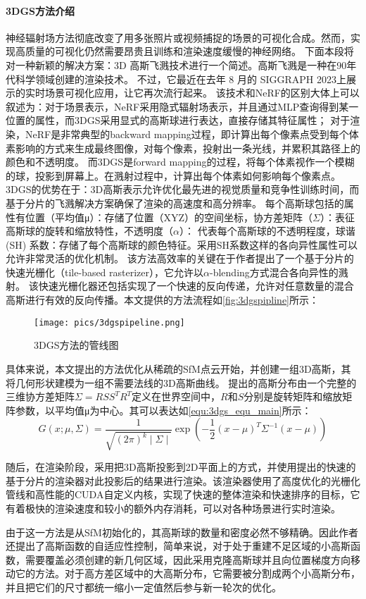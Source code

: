 \paragraph{3DGS方法介绍}
神经辐射场方法彻底改变了用多张照片或视频捕捉的场景的可视化合成。然而，实现高质量的可视化仍然需要昂贵且训练和渲染速度缓慢的神经网络。
下面本段将对一种新颖的解决方案：3D 高斯飞溅技术进行一个简述。高斯飞溅是一种在90年代科学领域创建的渲染技术。
不过，它最近在去年 8 月的 SIGGRAPH 2023上展示的实时场景可视化应用，让它再次流行起来。
该技术和NeRF的区别大体上可以叙述为：对于场景表示，NeRF采用隐式辐射场表示，并且通过MLP查询得到某一位置的属性，而3DGS采用显式的高斯球进行表达，直接存储其特征属性；
对于渲染，NeRF是非常典型的backward mapping过程，即计算出每个像素点受到每个体素影响的方式来生成最终图像，对每个像素，投射出一条光线，并累积其路径上的颜色和不透明度。
而3DGS是forward mapping的过程，将每个体素视作一个模糊的球，投影到屏幕上。在溅射过程中，计算出每个体素如何影响每个像素点。
3DGS的优势在于：3D高斯表示允许优化最先进的视觉质量和竞争性训练时间，而基于分片的飞溅解决方案确保了渲染的高速度和高分辨率。
每个高斯球包括的属性有位置（平均值μ）：存储了位置（XYZ）的空间坐标，协方差矩阵（$\Sigma$）：表征高斯球的旋转和缩放特性，不透明度（$\alpha$）：
代表每个高斯球的不透明程度，球谐 (SH) 系数：存储了每个高斯球的颜色特征。采用SH系数这样的各向异性属性可以允许非常灵活的优化机制。
该方法高效率的关键在于作者提出了一个基于分片的快速光栅化（tile-based rasterizer），它允许以$\alpha$-blending方式混合各向异性的溅射。
该快速光栅化器还包括实现了一个快速的反向传递，允许对任意数量的混合高斯进行有效的反向传播。本文提供的方法流程如\autoref{fig:3dgspipline}所示：

\begin{figure}[htbp]
    \centering
    \texttt{[image: pics/3dgspipeline.png]}
    \caption{\label{fig:3dgspipline}3DGS方法的管线图}
\end{figure}

具体来说，本文提出的方法优化从稀疏的SfM点云开始，并创建一组3D高斯，其将几何形状建模为一组不需要法线的3D高斯曲线。
提出的高斯分布由一个完整的三维协方差矩阵\(\Sigma=RSS^TR^T\)定义在世界空间中，$R$和$S$分别是旋转矩阵和缩放矩阵参数，以平均值μ为中心。其可以表达如\autoref{equ:3dgs_equ_main}所示：
\begin{equation}
    \label{equ:3dgs_equ_main}
    G\left(x;\mu,\Sigma\right)=\frac1{\sqrt{(2\pi)^k\mid\Sigma\mid}}\exp\left(-\frac12(x-\mu)^T\Sigma^{-1}(x-\mu)\right)
\end{equation}
\par 随后，在渲染阶段，采用把3D高斯投影到2D平面上的方式，并使用提出的快速的基于分片的渲染器对此投影后的结果进行渲染。该渲染器使用了高度优化的光栅化管线和高性能的CUDA自定义内核，实现了快速的整体渲染和快速排序的目标，它有着极快的渲染速度和较小的额外内存消耗，可以对各种场景进行实时渲染。
\par 由于这一方法是从SfM初始化的，其高斯球的数量和密度必然不够精确。因此作者还提出了高斯函数的自适应性控制，简单来说，对于处于重建不足区域的小高斯函数，需要覆盖必须创建的新几何区域，因此采用克隆高斯球并且向位置梯度方向移动它的方法。对于高方差区域中的大高斯分布，它需要被分割成两个小高斯分布，并且把它们的尺寸都统一缩小一定值然后参与新一轮次的优化。
